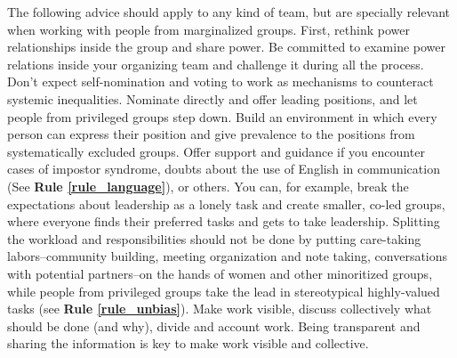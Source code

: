 \documentclass[10pt,letterpaper]{article}
\begin{document}
The following advice should apply to any kind of team, but are specially relevant when working with people from marginalized groups. First, rethink power relationships inside the group and share power. Be committed to examine power relations inside your organizing team and challenge it during all the process. %
Don't expect self-nomination and voting to work as mechanisms to counteract systemic inequalities. Nominate directly and offer leading positions, and let people from privileged groups step down. 
Build an environment in which every person can express their position and give prevalence to the positions from systematically excluded groups.
Offer support and guidance if you encounter cases of impostor syndrome, doubts about the use of English in communication (See \textbf{Rule \ref{rule_language}}), or others. You can, for example, break the expectations about leadership as a lonely task and create smaller, co-led groups, where everyone finds their preferred tasks and gets to take leadership. Splitting the workload and responsibilities should not be done by putting care-taking labors--community building, meeting organization and note taking, conversations with potential partners--on the hands of women and other minoritized groups, while people from privileged groups take the lead in stereotypical highly-valued tasks (see \textbf{Rule \ref{rule_unbias}}). Make work visible, discuss collectively what should be done (and why), divide and account work. Being transparent and sharing the information is key to make work visible and collective. %
\end{document}
